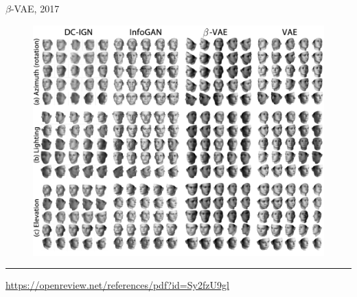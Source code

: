 \documentclass{beamer}
\begin{document}
\begin{frame}{$\beta$-VAE, 2017}
\begin{figure}
    \centering
    \includegraphics[width=0.8\linewidth]{figs/betaVAE_3.png}
\end{figure}
\vfill
\hrule\medskip
{\scriptsize \href{https://openreview.net/references/pdf?id=Sy2fzU9gl}{https://openreview.net/references/pdf?id=Sy2fzU9gl}}
\end{frame}
\end{document}
